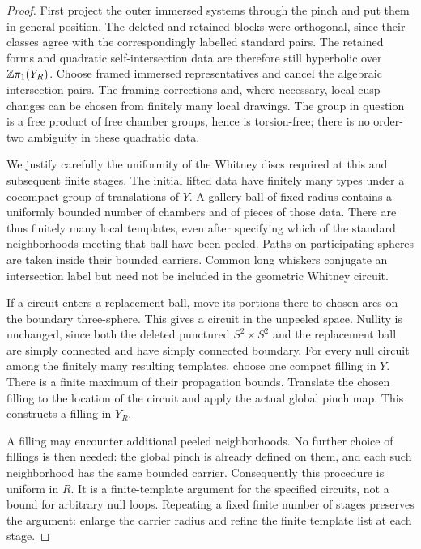 \begin{proof}
First project the outer immersed systems through the pinch and put them
in general position.  The deleted and retained blocks were orthogonal,
since their classes agree with the correspondingly labelled standard
pairs.  The retained forms and quadratic self-intersection data are
therefore still hyperbolic over $\mathbb Z\pi_1(Y_R)$.  Choose framed immersed
representatives and cancel the algebraic intersection pairs.  The
framing corrections and, where necessary, local cusp changes can be
chosen from finitely many local drawings.  The group in question is a
free product of free chamber groups, hence is torsion-free; there is no
order-two ambiguity in these quadratic data.

We justify carefully the uniformity of the Whitney discs required at
this and subsequent finite stages.  The initial lifted data have
finitely many types under a cocompact group of translations of $Y$.
A gallery ball of fixed radius contains a uniformly bounded number of
chambers and of pieces of those data.  There are thus finitely many
local templates, even after specifying which of the standard
neighborhoods meeting that ball have been peeled.  Paths on participating
spheres are taken inside their bounded carriers.  Common long whiskers
conjugate an intersection label but need not be included in the
geometric Whitney circuit.

If a circuit enters a replacement ball, move its portions there to
chosen arcs on the boundary three-sphere.  This gives a circuit in the
unpeeled space.  Nullity is unchanged, since both the deleted
punctured $S^2\times S^2$ and the replacement ball are simply connected
and have simply connected boundary.  For every null circuit among the
finitely many resulting templates, choose one compact filling in $Y$.
There is a finite maximum of their propagation bounds.  Translate the
chosen filling to the location of the circuit and apply the actual
global pinch map.  This constructs a filling in $Y_R$.

A filling may encounter additional peeled neighborhoods.  No further
choice of fillings is then needed: the global pinch is already defined
on them, and each such neighborhood has the same bounded carrier.
Consequently this procedure is uniform in $R$.  It is a finite-template
argument for the specified circuits, not a bound for arbitrary null
loops.  Repeating a fixed finite number of stages preserves the
argument: enlarge the carrier radius and refine the finite template
list at each stage.


\end{proof}
